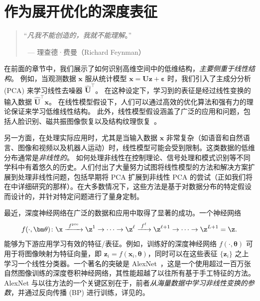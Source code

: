 \documentclass[../../book-main_zh.tex]{subfiles}
\begin{document}
\chapter{作为展开优化的深度表征}
\label{ch:deep-networks}

\begin{quote}
    \hfill    ``{\em 凡我不能创造的，我就不能理解}。''

    $~$ \hfill --- 理查德·费曼（Richard Feynman）
\end{quote}
\vspace{5mm}

在前面的章节中，我们展示了如何识别高维空间中的低维结构，\textit{主要侧重于线性结构}。
例如，当观测数据 $\bm{x}$ 服从统计模型 $\bm{x} = \bm{U}\bm{z} + \bm{\varepsilon}$ 时，我们引入了主成分分析 (PCA) 来学习线性去噪器 $\hat{\bm{U}}^{\top}$。
在这种设定下，学习到的表征是经过线性变换的输入数据 $\hat{\bm{U}}^{\top}\bm{x}$。
在线性模型假设下，人们可以通过高效的优化算法和强有力的理论保证来学习低维线性结构。
此外，线性模型假设涵盖了广泛的应用和问题，包括人脸识别、磁共振图像恢复以及结构纹理恢复~\cite{Wright-Ma-2022}。

另一方面，在处理实际应用时，尤其是当输入数据 $\bm{x}$ 非常复杂（如语音和自然语言、图像和视频以及机器人运动）时，线性模型可能会受到限制。这类数据的低维分布通常是{\em 非线性的}。
如何处理非线性在控制理论、信号处理和模式识别等不同学科中有着悠久的历史。人们付出了大量努力试图将线性模型的方法和解决方案扩展到处理非线性问题，包括早期将 PCA 扩展到非线性 PCA 的尝试（正如我们将在中详细研究的那样）。在大多数情况下，这些方法是基于对数据分布的特定假设而设计的，并针对特定问题进行了量身定制。

最近，深度神经网络在广泛的数据和应用中取得了显著的成功。一个神经网络
\begin{equation}
    f(\cdot, \bm \theta) \colon \x
    \xrightarrow{\hspace{1mm} f^{\mathrm{pre}} \hspace{1mm}} \z^1
    \rightarrow \cdots
    \rightarrow \z^\ell \xrightarrow{\hspace{1mm} f^\ell \hspace{1mm}}
    \z^{\ell+1} \rightarrow  \cdots \to \z^{L+1} = \z.
\end{equation}
能够为下游应用学习有效的特征/表征。例如，训练好的深度神经网络 $f(\cdot, \bm \theta)$ 可用于将图像映射为特征向量，即 $\bm{z}_i = f(\bm{x}_i,\bm \theta)$，同时可以在这些表征 $\{\bm{z}_i\}$ 之上学习一个线性分类器。一个著名的突破是 AlexNet~\cite{krizhevsky2012imagenet}，这是一个使用超过一百万张自然图像训练的深度卷积神经网络，其性能超越了以往所有基于手工特征的方法。AlexNet 与以往方法的一个关键区别在于，前者\textit{从海量数据中学习非线性变换的参数}，并通过反向传播 (BP) \cite{Back-Prop} 进行训练，详见的。
\end{document}
